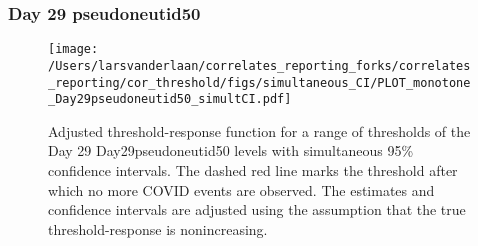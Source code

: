 \documentclass[]{article}
\begin{document}
\clearpage
\clearpage

\clearpage

\hypertarget{day-29-pseudoneutid50-3}{%
\subsubsection{Day 29 pseudoneutid50}\label{day-29-pseudoneutid50-3}}

\begin{figure}[H]
\centering
\texttt{[image: /Users/larsvanderlaan/correlates\_reporting\_forks/correlates\_reporting/cor\_threshold/figs/simultaneous\_CI/PLOT\_monotone\_Day29pseudoneutid50\_simultCI.pdf]}
\caption{Adjusted threshold-response function for a range of thresholds of the
  Day 29 Day29pseudoneutid50 levels with simultaneous 95\% confidence intervals. The dashed red line marks the threshold after which no more COVID events are observed. The estimates and confidence intervals are adjusted using the assumption that the true threshold-response is nonincreasing.}
\end{figure}
\end{document}
